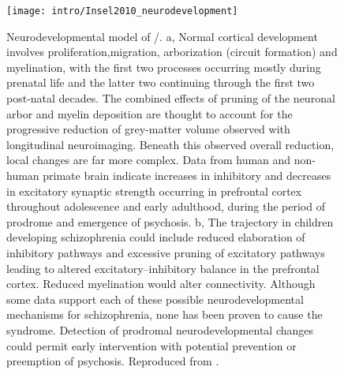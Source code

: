 \begin{figure}
	\centering
	\texttt{[image: intro/Insel2010\_neurodevelopment]}
	\caption[Neurodevelopmental model of \scz/]{Neurodevelopmental model of \scz/.
	a, Normal cortical development involves proliferation,migration, arborization (circuit formation) and myelination, with the first two processes occurring mostly during prenatal life and the latter two continuing through the first two post-natal decades. The combined effects of pruning of the neuronal arbor and myelin deposition are thought to account for the progressive reduction of grey-matter volume observed with longitudinal neuroimaging. Beneath this observed overall reduction, local changes are far more complex. Data from human and non-human primate brain indicate increases in inhibitory and decreases in excitatory synaptic strength occurring in prefrontal cortex throughout adolescence and early adulthood, during the period of prodrome and emergence of psychosis.
	b, The trajectory in children developing schizophrenia could include reduced elaboration of inhibitory pathways and excessive pruning of excitatory pathways leading to altered excitatory–inhibitory balance in the prefrontal cortex. Reduced myelination would alter connectivity. Although some data support each of these possible neurodevelopmental mechanisms for schizophrenia, none has been proven to cause the syndrome. Detection of prodromal neurodevelopmental changes could permit early intervention with potential prevention or preemption of psychosis.
	Reproduced from \citet{Insel2010a}.}
	\label{fig:intro:scz:neurodevelopmental}
\end{figure}

